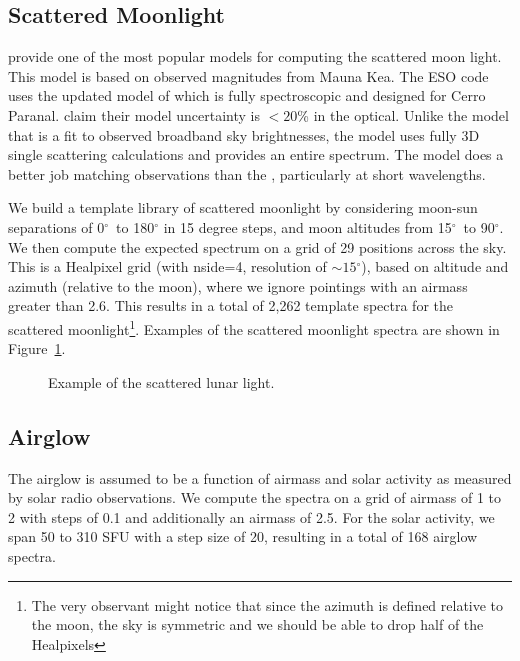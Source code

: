 \documentclass{emulateapj}  %
\newcommand\degree{{^\circ}}
\begin{document}
\subsection{Scattered Moonlight}

\citet{Krisciunas91} provide one of the most popular models for computing the scattered moon light. This model is based on observed magnitudes from Mauna Kea. The ESO code uses the updated model of \citet{Jones13} which is fully spectroscopic and designed for Cerro Paranal. \citet{Jones13} claim their model uncertainty is $<20$\% in the optical.  Unlike the \citet{Krisciunas91} model that is a fit to observed broadband sky brightnesses, the \citet{Jones13} model uses fully 3D single scattering calculations and provides an entire spectrum. The \citet{Jones13} model does a better job matching observations than the \citet{Krisciunas91}, particularly at short wavelengths.

We build a template library of scattered moonlight by considering moon-sun separations of 0$\degree$\ to 180$\degree$ in 15 degree steps, and moon altitudes from 15$\degree$\ to 90$\degree$.  We then compute the expected spectrum on a grid of 29 positions across the sky. This is a Healpixel grid (with nside=4, resolution of $\sim15\degree$), based on altitude and azimuth (relative to the moon), where we ignore pointings with an airmass greater than 2.6. This results in a total of 2,262 template spectra for the scattered moonlight\footnote{The very observant might notice that since the azimuth is defined relative to the moon, the sky is symmetric and we should be able to drop half of the Healpixels}. Examples of the scattered moonlight spectra are shown in Figure~\ref{fig:moon}.

\begin{figure}
  \caption{Example of the scattered lunar light. \label{fig:moon}}
\end{figure}


\subsection{Airglow}

The airglow is assumed to be a function of airmass and solar activity as measured by solar radio observations.  We compute the spectra on a grid of airmass of 1 to 2 with steps of 0.1 and additionally an airmass of 2.5.  For the solar activity, we span 50 to 310 SFU with a step size of 20, resulting in a total of 168 airglow spectra. 
\end{document}
